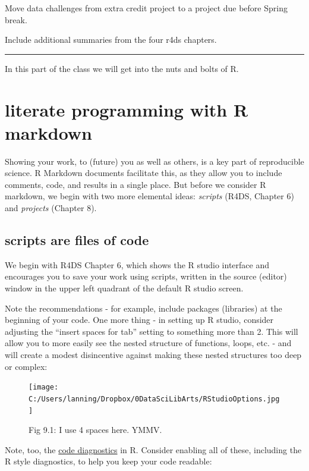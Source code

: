 \documentclass[
  openany]{book}
\begin{document}
Move data challenges from extra credit project to a project due before Spring break.

Include additional summaries from the four r4ds chapters.

\begin{center}\rule{0.5\linewidth}{\linethickness}\end{center}

In this part of the class we will get into the nuts and bolts of R.

\hypertarget{literate-programming-with-r-markdown}{%
\chapter{literate programming with R markdown}\label{literate-programming-with-r-markdown}}

Showing your work, to (future) you as well as others, is a key part of reproducible science. R Markdown documents facilitate this, as they allow you to include comments, code, and results in a single place. But before we consider R markdown, we begin with two more elemental ideas: \emph{scripts} (R4DS, Chapter 6) and \emph{projects} (Chapter 8).

\hypertarget{scripts-are-files-of-code}{%
\section{scripts are files of code}\label{scripts-are-files-of-code}}

We begin with R4DS Chapter 6, which shows the R studio interface and encourages you to save your work using scripts, written in the source (editor) window in the upper left quadrant of the default R studio screen.

Note the recommendations - for example, include packages (libraries) at the beginning of your code. One more thing - in setting up R studio, consider adjusting the ``insert spaces for tab'' setting to something more than 2. This will allow you to more easily see the nested structure of functions, loops, etc. - and will create a modest disincentive against making these nested structures too deep or complex:

\begin{figure}
\centering
\texttt{[image: C:/Users/lanning/Dropbox/0DataSciLibArts/RStudioOptions.jpg]}
\caption{Fig 9.1: I use 4 spaces here. YMMV.}
\end{figure}

Note, too, the \href{https://support.rstudio.com/hc/en-us/articles/205753617-Code-Diagnostics}{code diagnostics} in R. Consider enabling all of these, including the R style diagnostics, to help you keep your code readable:
\end{document}
